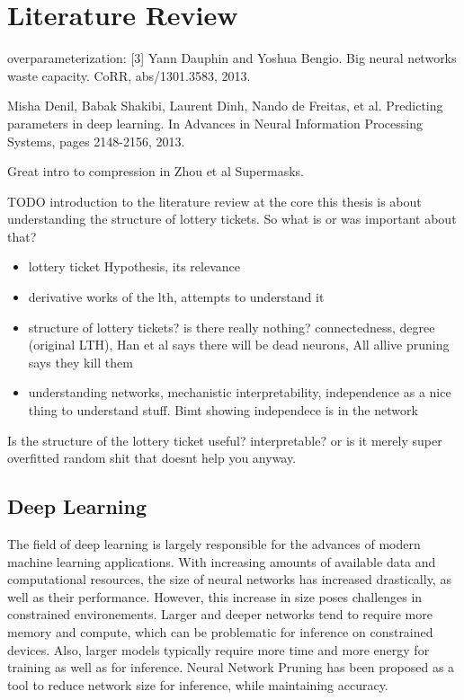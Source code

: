 \chapter{Literature Review}

overparameterization: [3] Yann Dauphin and Yoshua Bengio. Big neural networks waste capacity. CoRR, abs/1301.3583, 2013.

Misha Denil, Babak Shakibi, Laurent Dinh, Nando de Freitas, et al. Predicting parameters in deep learning. In Advances in Neural Information Processing Systems, pages 2148-2156, 2013.

Great intro to compression in Zhou et al Supermasks.

TODO introduction to the literature review  
at the core this thesis is about understanding the structure of lottery tickets. So what is or was important about that?
\begin{itemize}
    \item lottery ticket Hypothesis, its relevance 
    \item derivative works of the lth, attempts to understand it
    \item structure of lottery tickets? is there really nothing? connectedness, degree (original LTH), Han et al says there will be dead neurons, All allive pruning says they kill them
    \item understanding networks, mechanistic interpretability, independence as a nice thing to understand stuff. Bimt showing independece is in the network
\end{itemize}

Is the structure of the lottery ticket useful? interpretable? or is it merely super overfitted random shit that doesnt help you anyway.

\section{Deep Learning}
The field of deep learning is largely responsible for the advances of modern machine learning applications.
With increasing amounts of available data and computational resources, the size of neural networks has increased drastically, as well as their performance.
However, this increase in size poses challenges in constrained environements.
Larger and deeper networks tend to require more memory and compute, which can be problematic for inference on constrained devices.
Also, larger models typically require more time and more energy for training as well as for inference.
Neural Network Pruning \autocite{LeCun, OptimalBrainSurgeon, HanEtAl15, PruningFiltersForEfficientConvets} has been proposed as a tool to reduce network size for inference, while maintaining accuracy.

